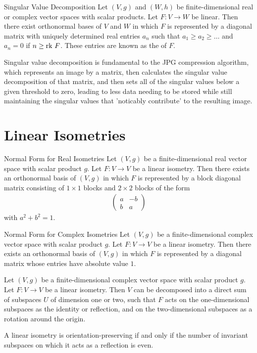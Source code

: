 \begin{importantcorollary}{Singular Value Decomposition}{}
	Let $(V,g)$ and $(W,h)$ be finite-dimensional real or complex vector spaces with scalar products. Let $F : V \to W$ be linear. Then there exist orthonormal bases of $V$ and $W$ in which $F$ is represented by a diagonal matrix with uniquely determined real entries $a_n$ such that $a_1 \geq a_2 \geq \hdots$ and $a_n = 0$ if $n \geq \textnormal{rk}~F$. These entries are known as the  of $F$.
\end{importantcorollary}
Singular value decomposition is fundamental to the JPG compression algorithm, which represents an image by a matrix, then calculates the singular value decomposition of that matrix, and then sets all of the singular values below a given threshold to zero, leading to less data needing to be stored while still maintaining the singular values that 'noticably contribute' to the resulting image.
\section{Linear Isometries}
\begin{importantcorollary}{Normal Form for Real Isometries}{}
	Let $(V,g)$ be a finite-dimensional real vector space with scalar product $g$. Let $F : V \to V$ be a linear isometry. Then there exists an orthonormal basis of $(V,g)$ in which $F$ is represented by a block diagonal matrix consisting of $1 \times 1$ blocks and $2 \times 2$ blocks of the form
	\begin{align*}
		\begin{pmatrix}
			a & -b\\
			b & a
		\end{pmatrix}
	\end{align*}
	with $a^2 + b^2 = 1$.
\end{importantcorollary}
\begin{importantcorollary}{Normal Form for Complex Isometries}{}
	Let $(V,g)$ be a finite-dimensional complex vector space with scalar product $g$. Let $F : V \to V$ be a linear isometry. Then there exists an orthonormal basis of $(V,g)$ in which $F$ is represented by a diagonal matrix whose entries have absolute value $1$.
\end{importantcorollary}
\begin{importantcorollary}{}{}
	Let $(V,g)$ be a finite-dimensional complex vector space with scalar product $g$. Let $F : V \to V$ be a linear isometry. Then $V$ can be decomposed into a direct sum of subspaces $U$ of dimension one or two, such that $F$ acts on the one-dimensional subspaces as the identity or reflection, and on the two-dimensional subspaces as a rotation around the origin.
\end{importantcorollary}
\begin{exercise}
	A linear isometry is orientation-preserving if and only if the number of invariant subspaces on which it acts as a reflection is even.
\end{exercise}
